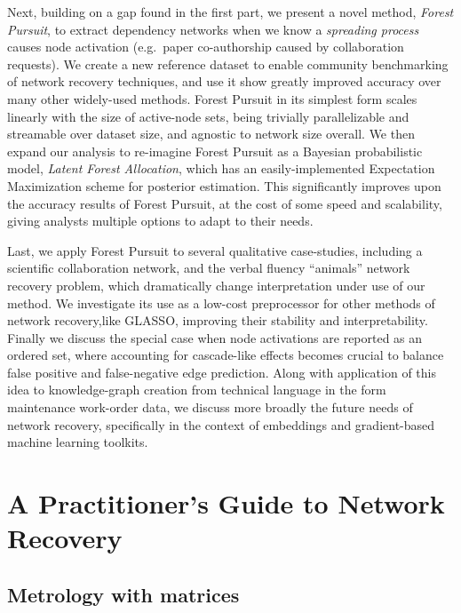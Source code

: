 \documentclass[%
	12pt,
		oneside,
		letterpaper
]{book}
\begin{document}
Next, building on a gap found in the first part, we present a novel
method, \emph{Forest Pursuit}, to extract dependency networks when we
know a \emph{spreading process} causes node activation (e.g.~paper
co-authorship caused by collaboration requests). We create a new
reference dataset to enable community benchmarking of network recovery
techniques, and use it show greatly improved accuracy over many other
widely-used methods. Forest Pursuit in its simplest form scales linearly
with the size of active-node sets, being trivially parallelizable and
streamable over dataset size, and agnostic to network size overall. We
then expand our analysis to re-imagine Forest Pursuit as a Bayesian
probabilistic model, \emph{Latent Forest Allocation}, which has an
easily-implemented Expectation Maximization scheme for posterior
estimation. This significantly improves upon the accuracy results of
Forest Pursuit, at the cost of some speed and scalability, giving
analysts multiple options to adapt to their needs.

Last, we apply Forest Pursuit to several qualitative case-studies,
including a scientific collaboration network, and the verbal fluency
``animals'' network recovery problem, which dramatically change
interpretation under use of our method. We investigate its use as a
low-cost preprocessor for other methods of network recovery,like GLASSO,
improving their stability and interpretability. Finally we discuss the
special case when node activations are reported as an ordered set, where
accounting for cascade-like effects becomes crucial to balance false
positive and false-negative edge prediction. Along with application of
this idea to knowledge-graph creation from technical language in the
form maintenance work-order data, we discuss more broadly the future
needs of network recovery, specifically in the context of embeddings and
gradient-based machine learning toolkits.

\part{A Practitioner's Guide to Network Recovery}

\chapter{Metrology with matrices}\label{metrology-with-matrices}
\end{document}
